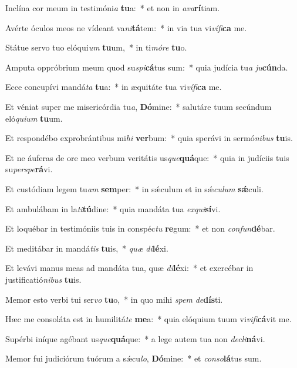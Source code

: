 \item Inclína cor meum in testimóni\textit{a} \textbf{tu}a:~* et non in \textit{a}\textit{va}\textbf{rí}tiam.
\item Avérte óculos meos ne vídeant va\textit{ni}\textbf{tá}tem:~* in via tua vi\textit{ví}\textit{fi}\textbf{ca} me.
\item Státue servo tuo elóqui\textit{um} \textbf{tu}um,~* in ti\textit{mó}\textit{re} \textbf{tu}o.
\item Amputa oppróbrium meum quod su\textit{spi}\textbf{cá}tus sum:~* quia judícia tu\textit{a} \textit{ju}\textbf{cún}da.
\item Ecce concupívi mandá\textit{ta} \textbf{tu}a:~* in æquitáte tua vi\textit{ví}\textit{fi}\textbf{ca} me.
\item Et véniat super me misericórdia tu\textit{a}, \textbf{Dó}mine:~* salutáre tuum secúndum eló\textit{qui}\textit{um} \textbf{tu}um.
\item Et respondébo exprobrántibus mi\textit{hi} \textbf{ver}bum:~* quia sperávi in sermó\textit{ni}\textit{bus} \textbf{tu}is.
\item Et ne áuferas de ore meo verbum veritátis us\textit{que}\textbf{quá}que:~* quia in judíciis tuis su\textit{per}\textit{spe}\textbf{rá}vi.
\item Et custódiam legem tu\textit{am} \textbf{sem}per:~* in sǽculum et in sǽ\textit{cu}\textit{lum} \textbf{sǽ}culi.
\item Et ambulábam in la\textit{ti}\textbf{tú}dine:~* quia mandáta tua \textit{ex}\textit{qui}\textbf{sí}vi.
\item Et loquébar in testimóniis tuis in conspéc\textit{tu} \textbf{re}gum:~* et non \textit{con}\textit{fun}\textbf{dé}bar.
\item Et meditábar in mandá\textit{tis} \textbf{tu}is,~* \textit{quæ} \textit{di}\textbf{lé}xi.
\item Et levávi manus meas ad mandáta tua, quæ \textit{di}\textbf{lé}xi:~* et exercébar in justificatió\textit{ni}\textit{bus} \textbf{tu}is.
\item Memor esto verbi tui ser\textit{vo} \textbf{tu}o,~* in quo mihi \textit{spem} \textit{de}\textbf{dís}ti.
\item Hæc me consoláta est in humilitá\textit{te} \textbf{me}a:~* quia elóquium tuum vi\textit{vi}\textit{fi}\textbf{cá}vit me.
\item Supérbi iníque agébant us\textit{que}\textbf{quá}que:~* a lege autem tua non \textit{de}\textit{cli}\textbf{ná}vi.
\item Memor fui judiciórum tuórum a sǽcu\textit{lo}, \textbf{Dó}mine:~* et \textit{con}\textit{so}\textbf{lá}tus sum.

